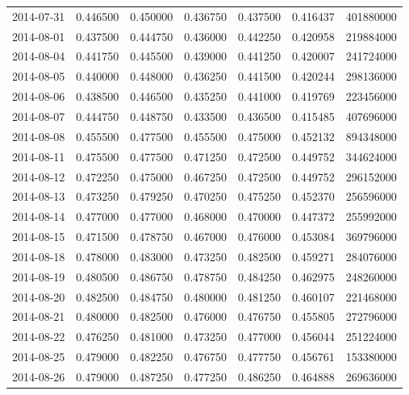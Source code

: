 \begin{tabular}{lrrrrrr}
2014-07-31 &    0.446500 &    0.450000 &    0.436750 &    0.437500 &    0.416437 &   401880000 \\
2014-08-01 &    0.437500 &    0.444750 &    0.436000 &    0.442250 &    0.420958 &   219884000 \\
2014-08-04 &    0.441750 &    0.445500 &    0.439000 &    0.441250 &    0.420007 &   241724000 \\
2014-08-05 &    0.440000 &    0.448000 &    0.436250 &    0.441500 &    0.420244 &   298136000 \\
2014-08-06 &    0.438500 &    0.446500 &    0.435250 &    0.441000 &    0.419769 &   223456000 \\
2014-08-07 &    0.444750 &    0.448750 &    0.433500 &    0.436500 &    0.415485 &   407696000 \\
2014-08-08 &    0.455500 &    0.477500 &    0.455500 &    0.475000 &    0.452132 &   894348000 \\
2014-08-11 &    0.475500 &    0.477500 &    0.471250 &    0.472500 &    0.449752 &   344624000 \\
2014-08-12 &    0.472250 &    0.475000 &    0.467250 &    0.472500 &    0.449752 &   296152000 \\
2014-08-13 &    0.473250 &    0.479250 &    0.470250 &    0.475250 &    0.452370 &   256596000 \\
2014-08-14 &    0.477000 &    0.477000 &    0.468000 &    0.470000 &    0.447372 &   255992000 \\
2014-08-15 &    0.471500 &    0.478750 &    0.467000 &    0.476000 &    0.453084 &   369796000 \\
2014-08-18 &    0.478000 &    0.483000 &    0.473250 &    0.482500 &    0.459271 &   284076000 \\
2014-08-19 &    0.480500 &    0.486750 &    0.478750 &    0.484250 &    0.462975 &   248260000 \\
2014-08-20 &    0.482500 &    0.484750 &    0.480000 &    0.481250 &    0.460107 &   221468000 \\
2014-08-21 &    0.480000 &    0.482500 &    0.476000 &    0.476750 &    0.455805 &   272796000 \\
2014-08-22 &    0.476250 &    0.481000 &    0.473250 &    0.477000 &    0.456044 &   251224000 \\
2014-08-25 &    0.479000 &    0.482250 &    0.476750 &    0.477750 &    0.456761 &   153380000 \\
2014-08-26 &    0.479000 &    0.487250 &    0.477250 &    0.486250 &    0.464888 &   269636000 \\

\end{tabular}
